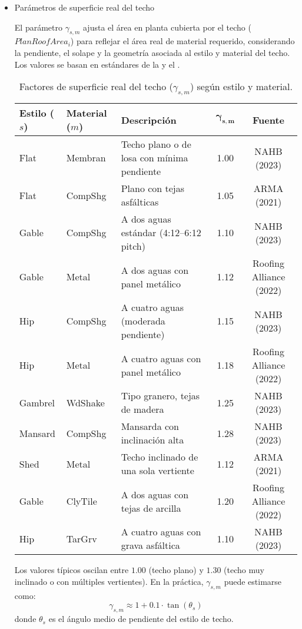 \begin{itemize}
    \item{Parámetros de superficie real del techo}

El parámetro $\gamma_{s,m}$ ajusta el área en planta cubierta por el techo
($PlanRoofArea_i$) para reflejar el área real de material requerido, considerando
la pendiente, el solape y la geometría asociada al estilo y material del techo.
Los valores se basan en estándares de
la \cite {ARMA2021} y el \cite{RoofingAlliance2022}.

\begin{table}[H]
\centering
\caption{Factores de superficie real del techo ($\gamma_{s,m}$) según estilo y material.}
\label{tab:roof_gamma}
\begin{tabular}{lllcc}
\toprule
\textbf{Estilo ($s$)} & \textbf{Material ($m$)} & \textbf{Descripción} & $\boldsymbol{\gamma_{s,m}}$ & \textbf{Fuente}\\
\midrule
Flat        & Membran      & Techo plano o de losa con mínima pendiente & 1.00 & NAHB (2023)\\
Flat        & CompShg      & Plano con tejas asfálticas & 1.05 & ARMA (2021)\\
Gable       & CompShg      & A dos aguas estándar (4:12–6:12 pitch) & 1.10 & NAHB (2023)\\
Gable       & Metal        & A dos aguas con panel metálico & 1.12 & Roofing Alliance (2022)\\
Hip         & CompShg      & A cuatro aguas (moderada pendiente) & 1.15 & NAHB (2023)\\
Hip         & Metal        & A cuatro aguas con panel metálico & 1.18 & Roofing Alliance (2022)\\
Gambrel     & WdShake      & Tipo granero, tejas de madera & 1.25 & NAHB (2023)\\
Mansard     & CompShg      & Mansarda con inclinación alta & 1.28 & NAHB (2023)\\
Shed        & Metal        & Techo inclinado de una sola vertiente & 1.12 & ARMA (2021)\\
Gable       & ClyTile      & A dos aguas con tejas de arcilla & 1.20 & Roofing Alliance (2022)\\
Hip         & TarGrv       & A cuatro aguas con grava asfáltica & 1.10 & NAHB (2023)\\
\bottomrule
\end{tabular}
\end{table}

Los valores típicos oscilan entre $1.00$ (techo plano) y $1.30$ (techo muy inclinado
o con múltiples vertientes). En la práctica, $\gamma_{s,m}$ puede estimarse como:
\[
\gamma_{s,m} \approx 1 + 0.1 \cdot \tan(\theta_s)
\]
donde $\theta_s$ es el ángulo medio de pendiente del estilo de techo.


\end{itemize}
